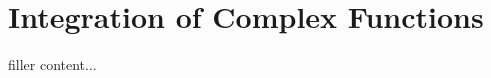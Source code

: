 \documentclass[../../templates/section]{subfiles}
\begin{document}
\section{Integration of Complex Functions}\label{sec:integration-of-complex-functions}

filler content...
\end{document}
